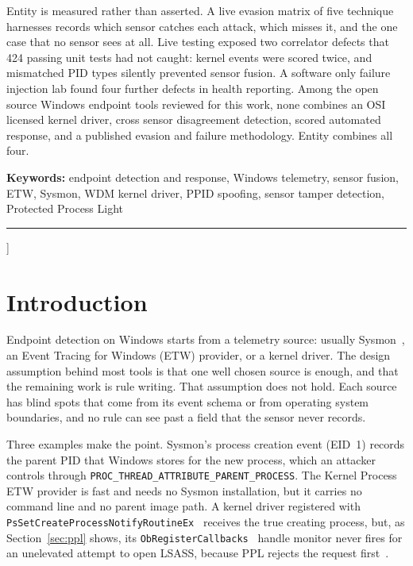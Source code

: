 \documentclass[10pt,twocolumn,letterpaper]{article}
\newcommand{\code}[1]{\texttt{\small #1}}
\begin{document}
{\begin{minipage}{\textwidth}
\smallskip
Entity is measured rather than asserted. A live evasion matrix of five technique harnesses
records which sensor catches each attack, which misses it, and the one case that no sensor
sees at all. Live testing exposed two correlator defects that 424 passing unit tests had
not caught: kernel events were scored twice, and mismatched PID types silently prevented
sensor fusion. A software only failure injection lab found four further defects in health
reporting. Among the open source Windows endpoint tools reviewed for this work, none
combines an OSI licensed kernel driver, cross sensor disagreement detection, scored
automated response, and a published evasion and failure methodology. Entity combines all
four.

\smallskip
{\sffamily\bfseries\color{Ink} Keywords:}\enspace
endpoint detection and response, Windows telemetry, sensor fusion, ETW, Sysmon,
WDM kernel driver, PPID spoofing, sensor tamper detection, Protected Process Light
\end{minipage}
\vspace{4pt}
{\color{BHRed}\rule{\textwidth}{0.6pt}}
\vspace{10pt}
}]

\section{Introduction}
\label{sec:intro}

Endpoint detection on Windows starts from a telemetry source: usually
Sysmon~\cite{sysmon}, an Event Tracing for Windows (ETW) provider, or a kernel driver.
The design assumption behind most tools is that one well chosen source is enough, and
that the remaining work is rule writing. That assumption does not hold. Each source has
blind spots that come from its event schema or from operating system boundaries, and no
rule can see past a field that the sensor never records.

Three examples make the point. Sysmon's process creation event (EID~1) records the parent
PID that Windows stores for the new process, which an attacker controls through
\code{PROC\_THREAD\_ATTRIBUTE\_PARENT\_PROCESS}. The Kernel Process ETW provider is fast
and needs no Sysmon installation, but it carries no command line and no parent image path.
A kernel driver registered with \code{PsSetCreateProcessNotifyRoutineEx}~\cite{psnotify}
receives the true creating process, but, as Section~\ref{sec:ppl} shows, its
\code{ObRegisterCallbacks}~\cite{obregister} handle monitor never fires for an unelevated
attempt to open LSASS, because PPL rejects the request first~\cite{ppl}.
\end{document}
